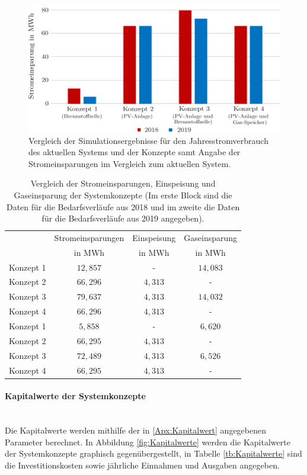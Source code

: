 \begin{figure}[h]
	\centering
		\includegraphics[scale=1]{Figures/Stromverbrauch_Sim_2}
		\caption{Vergleich der Simulationsergebnisse für den Jahresstromverbrauch des aktuellen Systems und der Konzepte samt Angabe der Stromeinsparungen im Vergleich zum aktuellen System.}
\label{fig:Strom}	
\end{figure}

\begin{table}[htb]
		\centering
		\caption{Vergleich der Stromeinsparungen, Einspeisung und Gaseinsparung der Systemkonzepte (Im erste Block sind die Daten für die Bedarfsverläufe aus 2018 und im zweite die Daten für die Bedarfsverläufe aus 2019 angegeben).}
		\begin{tabular}{l c c c}
		\toprule 
		& Stromeinsparungen & Einspeisung & Gaseinsparung
		\\
	    & in MWh & in MWh & in MWh\\
		\midrule
		Konzept 1 & $12,857$ &    -    & $14,083$\\
		Konzept 2 & $66,296$ & $4,313$ &    -    \\
		Konzept 3 & $79,637$ & $4,313$ & $14,032$\\
		Konzept 4 & $66,296$ & $4,313$ &    -    \\
		\midrule
		Konzept 1 & $5,858$  &    -    & $6,620$\\
		Konzept 2 & $66,295$ & $4,313$ &    -   \\
		Konzept 3 & $72,489$ & $4,313$ & $6,526$\\
		Konzept 4 & $66,295$ & $4,313$ &    -   \\
		\bottomrule
		\end{tabular}
		\label{tb:ErgebnisseSim}
\end{table}	
\FloatBarrier

\paragraph{Kapitalwerte der Systemkonzepte}\ \\
Die Kapitalwerte werden mithilfe der in \ref{Apx:Kapitalwert} angegebenen Parameter berechnet. In Abbildung \ref{fig:Kapitalwerte} werden die Kapitalwerte der Systemkonzepte graphisch gegenübergestellt, in Tabelle \ref{tb:Kapitalwerte} sind die Investitionskosten sowie jährliche Einnahmen und Ausgaben angegeben.\\

